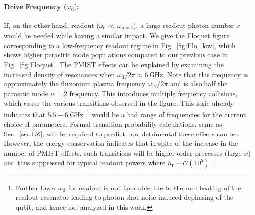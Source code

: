 \documentclass[%
reprint,
superscriptaddress,
 amsmath,amssymb,
 aps,
 prx,
longbibliography,
floatfix,
]{revtex4-2}
\begin{document}
\paragraph{Drive Frequency ($\omega_\textrm{d}$):} If, on the other hand, readout ($\omega_\textrm{d} \ll \omega_{\mu = 2}$), a large readout photon number $x$ would be needed while having a similar impact. We give the Floquet figure corresponding to a low-frequency readout regime in Fig.~\ref{fig:Flo_low}, which shows higher parasitic mode populations compared to our previous case in Fig.~\ref{fig:Floquet}. The PMIST effects can be explained by examining the increased density of resonances when $\omega_\textrm{d}/2\pi \approx 6 \ \mathrm{GHz}$. Note that this frequency is approximately the fluxonium plasma frequency $\omega_{12}/2\pi$ and is also half the parasitic mode $\mu=2$ frequency. This introduces multiple frequency collisions, which cause the various transitions observed in the figure. This logic already indicates that $5.5-6 \ \mathrm{GHz}$~\footnote{Further lower $\omega_\textrm{d}$ for readout is not favorable due to thermal heating of the readout resonator leading to photon-shot-noise induced dephasing of the qubit, and hence not analyzed in this work.} would be a bad range of frequencies for the current choice of parameters. Formal transition probability calculations, same as Sec.~\ref{sec:LZ}, will be required to predict how detrimental these effects can be. However, the energy conservation indicates that in spite of the increase in the number of PMIST effects, such transitions will be higher-order processes (large $x$) and thus suppressed for typical readout powers where $\bar n_\textrm{r}\sim \mathcal{O}(10^2)$~\cite{gusenkova2021quantum}.
\end{document}
